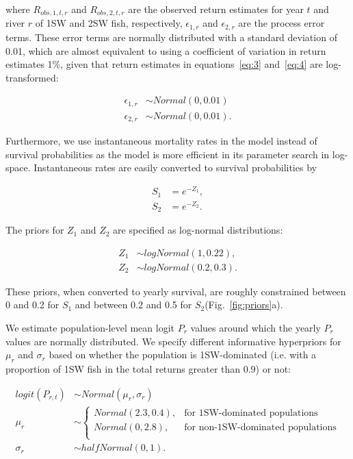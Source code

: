 \documentclass[12pt]{article}
\newcommand{\So}{$S_{1}$\xspace}
\newcommand{\St}{$S_{2}$\xspace}
\newcommand{\Pg}{$P_r$\xspace}
\newcommand{\prmu}{$\mu_r$\xspace}
\newcommand{\prsig}{$\sigma_r$\xspace}
\begin{document}
where $R_{obs,1,t,r}$ and $R_{obs,2,t,r}$ are the observed return estimates
for year $t$ and river $r$ of 1SW and 2SW fish, respectively, $\epsilon_{1,r}$
and $\epsilon_{2,r}$ are the process error terms. 
These error terms are normally distributed with a standard deviation
of 0.01, which are almost equivalent to using a coefficient of variation in
return estimates 1\%, given that return estimates in equations~\ref{eq:3}
and~\ref{eq:4} are log-transformed:

\begin{align}
\epsilon_{1,r} &\sim Normal(0, 0.01) \\
\epsilon_{2,r} &\sim Normal(0, 0.01).
\end{align}

Furthermore, we use instantaneous mortality rates in the model instead of
survival probabilities as the model is more efficient in its parameter search
in log-space. Instantaneous rates are easily converted to survival
probabilities by 

\begin{align}
 S_{1} &= e^{-Z_1}, \\
 S_{2} &= e^{-Z_2}. 
\end{align}

The priors for $Z_1$ and $Z_2$ are specified as log-normal distributions:

\begin{align}
Z_1 &\sim logNormal(1, 0.22),   \\ 
Z_2 &\sim logNormal(0.2, 0.3).
\end{align}

These priors, when converted to yearly survival, are roughly constrained between
0 and 0.2 for \So and between 0.2 and 0.5 for \St (Fig.~\ref{fig:priors}a).

We estimate population-level mean logit \Pg values around which the yearly \Pg
values are normally distributed. We specify different informative hyperpriors
for \prmu and \prsig based on whether the population is 1SW-dominated (i.e.
with a proportion of 1SW fish in the total returns greater than 0.9) or not:

\begin{align}
    logit(P_{r,t}) &\sim Normal(\mu_r, \sigma_r) \\
    \mu_r &\sim 
    \begin{cases}
       Normal(2.3, 0.4),  &\text{for 1SW-dominated populations} \\
       Normal(0, 2.8), &\text{for non-1SW-dominated populations} \\
   \end{cases} \\
    \sigma_r &\sim halfNormal(0, 1).
\end{align}
\end{document}
